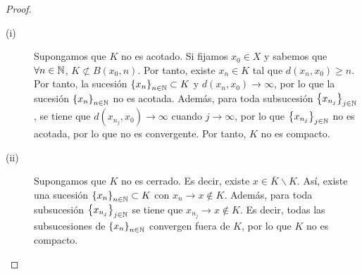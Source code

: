 \begin{proof}
\begin{description}
\item[(i)] Supongamos que $\displaystyle K $ no es acotado. Si fijamos $\displaystyle x_{0} \in X $ y sabemos que $\displaystyle \forall n \in \mathbb{N} $, $\displaystyle K \not\subset B\left(x_{0}, n\right) $. Por tanto, existe $\displaystyle x_{n} \in K $ tal que $\displaystyle d\left(x_{n}, x_{0}\right) \geq n $. Por tanto, la sucesión $\displaystyle \left\{ x_{n}\right\} _{n\in\mathbb{N}} \subset K $ y $\displaystyle d\left(x_{n}, x_{0}\right) \to \infty $, por lo que la sucesión $\displaystyle \left\{ x_{n}\right\} _{n\in\mathbb{N}} $ no es acotada. 
	Además, para toda subsucesión $\displaystyle \left\{ x_{n_{j}}\right\} _{j \in \mathbb{N}} $, se tiene que $\displaystyle d\left(x_{n_{j}},x_{0}\right) \to \infty $ cuando $\displaystyle j \to \infty $, por lo que $\displaystyle \left\{ x_{n_{j}}\right\} _{j \in \mathbb{N}} $ no es acotada, por lo que no es convergente. Por tanto, $\displaystyle K $ no es compacto.
\item[(ii)] Supongamos que $\displaystyle K $ no es cerrado. Es decir, existe $\displaystyle x \in \overline{K}\backslash K $. Así, existe una sucesión $\displaystyle \left\{ x_{n}\right\} _{n\in\mathbb{N}} \subset K $ con $\displaystyle x_{n} \to x \not\in K $. Además, para toda subsucesión $\displaystyle \left\{ x_{n_{j}}\right\} _{j \in \mathbb{N}} $ se tiene que $\displaystyle x_{n_{j}} \to x \not\in K$. Es decir, todas las subsucesiones de $\displaystyle \left\{ x_{n}\right\} _{n\in\mathbb{N}} $ convergen fuera de $\displaystyle K $, por lo que $\displaystyle K $ no es compacto.
\end{description}
\end{proof}

